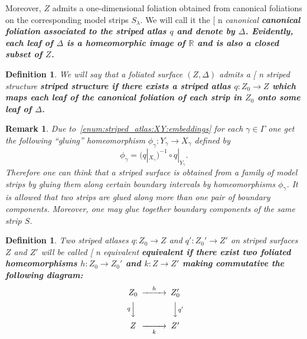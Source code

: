 \documentclass[12pt, reqno]{amsart}
\makeatletter
\newcommand{\definitionname}{Definition}%
\newcommand{\remarkname}{Remark}%
\newtheorem{definition}[subsection]{\protect\definitionname}
\newtheorem{remark}[subsection]{\protect\remarkname}
\def\myemphInternal#1{\if n\f@shape%
\begingroup\itshape #1\endgroup\/%
\else\begingroup\bfseries #1\endgroup%
\fi}
\def\myemph{\futurelet\testchar\MaybeOptArgmyemph}
\def\MaybeOptArgmyemph{\ifx[\testchar \let\next\OptArgmyemph
                 \else \let\next\NoOptArgmyemph \fi \next}
\def\OptArgmyemph[#1]#2{\index{#1}\myemphInternal{#2}}
\def\NoOptArgmyemph#1{\myemphInternal{#1}}
\newcommand{\bR}{\mathbb{R}}
\newcommand{\Partition}{\Delta}
\newcommand{\strip}{S}
\newcommand{\stripSurf}{Z}
\newcommand{\preStripSurf}{\stripSurf_0}
\newcommand{\bdX}{X}
\newcommand{\bdY}{Y}
\newcommand{\bdGlueInd}{{\gamma}}
\newcommand{\BdGlueInd}{\Gamma}
\newcommand{\qmap}{q}
\makeatother
\begin{document}
Moreover, $\stripSurf$ admits a one-dimensional foliation obtained from canonical foliations on the corresponding model strips $S_{\lambda}$.
We will call it the \myemph{canonical} foliation associated to the striped atlas $\qmap$ and denote by $\Partition$.
Evidently, each leaf of $\Partition$ is a homeomorphic image of $\bR$ and is also a closed subset of $\stripSurf$.


\begin{definition}\label{def:agreeing_atlas_and_foliation}
We will say that a foliated surface $(\stripSurf,\Partition)$ admits a \myemph{striped structure} if there exists a striped atlas $\qmap:\preStripSurf\to\stripSurf$ which maps each leaf of the canonical foliation of each strip in $\preStripSurf$ onto some leaf of $\Partition$.
\end{definition}


\begin{remark}
Due to~\ref{enum:striped_atlas:XY:embeddings} for each $\bdGlueInd \in \BdGlueInd$ one get the following ``gluing'' homeomorphism $\phi_{\bdGlueInd}: \bdY_{\bdGlueInd} \to \bdX_{\bdGlueInd}$ defined by 
\begin{equation}\label{equ:gluing_map}
\phi_{\bdGlueInd} = \bigl(\qmap|_{\bdX_{\bdGlueInd}}\bigr)^{-1} \circ  \qmap|_{\bdY_{\bdGlueInd}}.
\end{equation}
Therefore one can think that a striped surface is obtained from a family of model strips by gluing them along certain boundary intervals by homeomorphisms $\phi_{\bdGlueInd}$.
It is allowed that two strips are glued along more than one pair of boundary components.
Moreover, one may glue together boundary components of the same strip $\strip$.
\end{remark}

\begin{definition}\label{def:strip_surf_equiv}
Two striped atlases $\qmap : \preStripSurf \to \stripSurf$ and $\qmap' : \preStripSurf' \to \stripSurf'$ on striped surfaces $\stripSurf$ and $\stripSurf'$ will be called \myemph{equivalent} if there exist two foliated homeomorphisms $h : \preStripSurf \to \preStripSurf'$ and $k : \stripSurf \to \stripSurf'$ making commutative the following diagram:
\begin{equation}\label{eq:strip_surf_equiv}
\begin{CD}
\preStripSurf @>{h}>> \preStripSurf'\\
@V{\qmap}VV @VV{\qmap'}V \\
\stripSurf @>>{k}> \stripSurf'
\end{CD}
\end{equation}
\end{definition}
\end{document}
